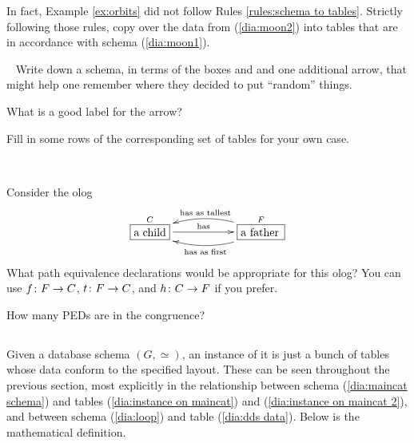 \documentclass[CT4S-EN-RU]{subfiles}
\begin{document}
\begin{exerciseENG}
In fact, Example \ref{ex:orbits} did not follow Rules \ref{rules:schema to tables}. Strictly following those rules, copy over the data from (\ref{dia:moon2}) into tables that are in accordance with schema (\ref{dia:moon1}).
\end{exerciseENG}

\begin{exerciseRUS}
\end{exerciseRUS}

\begin{exerciseENG}~
\sexc Write down a schema, in terms of the boxes  and  and one additional arrow, that might help one remember where they decided to put “random” things. 
\item What is a good label for the arrow? 
\item Fill in some rows of the corresponding set of tables for your own case.
\endsexc
\end{exerciseENG}

\begin{exerciseRUS}~
\end{exerciseRUS}

\begin{exerciseENG}\label{exc:father and child}
Consider the olog 
$$
\xymatrix{\obox{C}{.4in}{a child}\LA{rr}{has}&&\obox{F}{.5in}{a father}\ar@/^1pc/[ll]^{\tn{has as first}}\ar@/_1pc/[ll]_{\tn{has as tallest}}}
$$
\sexc What path equivalence declarations would be appropriate for this olog? You can use $f\colon F\rightarrow C$, $t\colon F\rightarrow C$, and $h\colon C\rightarrow F$ if you prefer. 
\item How many PEDs are in the congruence?
\endsexc
\end{exerciseENG}

\begin{exerciseRUS}\label{exc:father and child}
\end{exerciseRUS}


\subsection{}

\begin{blockENG}
Given a database schema $(G,\simeq)$, an instance of it is just a bunch of tables whose data conform to the specified layout. These can be seen throughout the previous section, most explicitly in the relationship between schema (\ref{dia:maincat schema}) and tables (\ref{dia:instance on maincat}) and (\ref{dia:instance on maincat 2}), and between schema (\ref{dia:loop}) and table (\ref{dia:dds data}). Below is the mathematical definition.
\end{blockENG}
\end{document}
